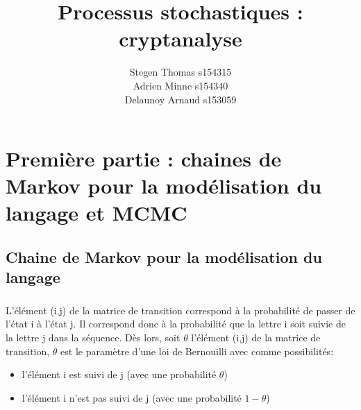 \documentclass[11pt]{report}
\title{Processus stochastiques : cryptanalyse}
\author{Stegen Thomas s154315 \\ Adrien Minne s154340 \\ Delaunoy Arnaud s153059}
\date{}
\begin{document}
\setcounter{secnumdepth}{3}

\begin{titlepage}
\maketitle
\end{titlepage}
\section{ Première partie : chaines de Markov pour la modélisation du langage et MCMC}
\subsection{Chaine de Markov pour la modélisation du langage}
\subsubsection{}
L'élément (i,j) de la matrice de transition correspond à la probabilité de passer de l'état i à l'état j. Il correspond donc à la probabilité que la lettre i soit suivie de la lettre j dans la séquence. Dès lors, soit $\theta$ l'élément (i,j) de la matrice de transition, $\theta$ est le paramètre d'une loi de Bernouilli avec comme possibilités:
\begin{itemize}
\item l'élément i est suivi de j (avec une probabilité $\theta$)
\item l'élément i n'est pas suivi de j (avec une probabilité $1-\theta$)
\end{itemize}
\end{document}
